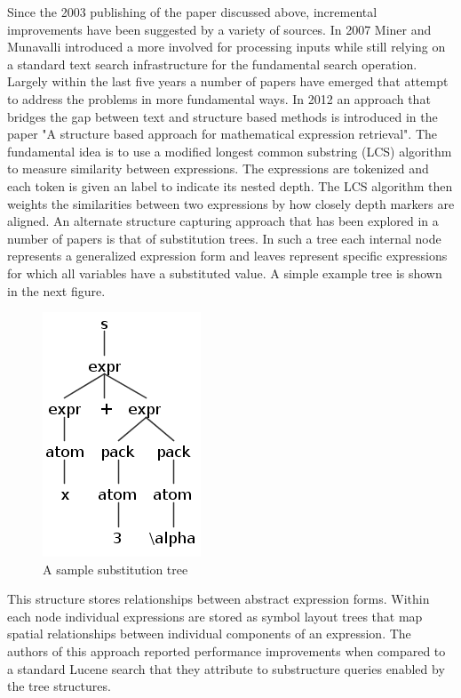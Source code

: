 \documentclass{sig-alternate}
\begin{document}
Since the 2003 publishing of the paper discussed above, incremental
improvements have been suggested by a variety of sources. In 2007 Miner
and Munavalli introduced a more involved for processing inputs while
still relying on a standard text search infrastructure for the 
fundamental search operation.\cite{miner:approach} Largely within the last five years a number of 
papers have emerged that attempt to address the problems in more
fundamental ways.
In 2012 an approach that bridges the gap between text and structure based
methods is introduced in the paper "A structure based
approach for mathematical expression retrieval".\cite{kumar:structure} The fundamental
idea is to use a modified longest common substring (LCS) algorithm to 
measure similarity between expressions. The expressions are tokenized
and each token is given an label to indicate its nested depth. The LCS
algorithm then weights the similarities between two expressions by how
closely depth markers are aligned. 
An alternate structure capturing approach that has been explored in
a number of papers is that of substitution trees.\cite{kolhase:mathwebsearch}\cite{yuan:layout} In such a tree each
internal node represents a generalized expression form and leaves
represent specific expressions for which all variables have a 
substituted value. A simple example tree is shown in the next figure.
\begin{figure}
	\centering
	\includegraphics{subtree}
	\caption{A sample substitution tree}
\end{figure}
This structure stores relationships between abstract expression forms.
Within each node individual expressions are stored as symbol layout trees
that map spatial relationships between individual components of an expression.
The authors of this approach reported performance improvements when compared
to a standard Lucene search that they attribute to substructure queries 
enabled by the tree structures. 
\end{document}
